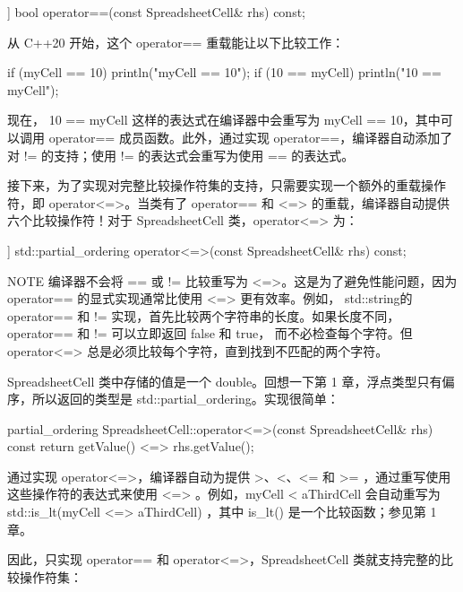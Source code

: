 \begin{cpp}
[[nodiscard]] bool operator==(const SpreadsheetCell& rhs) const;
\end{cpp}

从 C++20 开始，这个 operator== 重载能让以下比较工作：

\begin{cpp}
if (myCell == 10) { println("myCell == 10"); }
if (10 == myCell) { println("10 == myCell"); }
\end{cpp}

现在， 10 == myCell 这样的表达式在编译器中会重写为 myCell == 10，其中可以调用 operator== 成员函数。此外，通过实现 operator==，编译器自动添加了对 != 的支持；使用 != 的表达式会重写为使用 == 的表达式。

接下来，为了实现对完整比较操作符集的支持，只需要实现一个额外的重载操作符，即 operator<=>。当类有了 operator== 和 <=> 的重载，编译器自动提供六个比较操作符！对于 SpreadsheetCell 类，operator<=> 为：

\begin{cpp}
[[nodiscard]] std::partial_ordering operator<=>(const SpreadsheetCell& rhs) const;
\end{cpp}

\begin{myNotic}{NOTE}
编译器不会将 == 或 != 比较重写为 <=>。这是为了避免性能问题，因为 operator== 的显式实现通常比使用 <=> 更有效率。例如， std::string的 operator== 和 != 实现，首先比较两个字符串的长度。如果长度不同，operator== 和 != 可以立即返回 false 和 true， 而不必检查每个字符。但operator<=> 总是必须比较每个字符，直到找到不匹配的两个字符。
\end{myNotic}

SpreadsheetCell 类中存储的值是一个 double。回想一下第 1 章，浮点类型只有偏序，所以返回的类型是 std::partial\_ordering。实现很简单：

\begin{cpp}
partial_ordering SpreadsheetCell::operator<=>(const SpreadsheetCell& rhs) const
{
    return getValue() <=> rhs.getValue();
}
\end{cpp}

通过实现 operator<=>，编译器自动为提供 >、<、<= 和 >= ，通过重写使用这些操作符的表达式来使用 <=> 。例如，myCell < aThirdCell 会自动重写为 std::is\_lt(myCell <=> aThirdCell) ，其中 is\_lt() 是一个比较函数；参见第 1 章。

因此，只实现 operator== 和 operator<=>，SpreadsheetCell 类就支持完整的比较操作符集：

